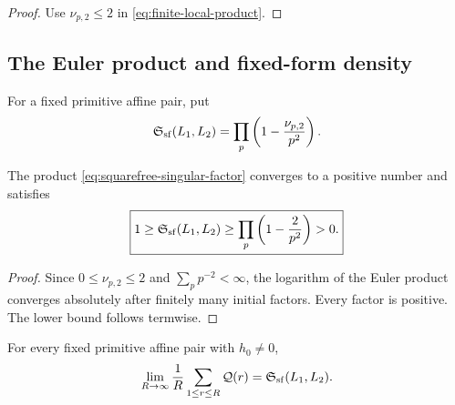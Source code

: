 \begin{proof}
Use \(\nu_{p,2}\le2\) in
\eqref{eq:finite-local-product}.
\end{proof}

\subsection{The Euler product and fixed-form density}

\begin{definition}
\label{def:squarefree-singular-factor}
For a fixed primitive affine pair, put
\begin{equation}
 \mathfrak S_{\mathrm{sf}}(L_1,L_2)
 =
 \prod_p
 \left(1-\frac{\nu_{p,2}}{p^2}\right).
\label{eq:squarefree-singular-factor}
\end{equation}
\end{definition}

\begin{proposition}
\label{prop:euler-product-positive}
The product \eqref{eq:squarefree-singular-factor} converges to a
positive number and satisfies
\begin{equation}
 \boxed{
 1\ge\mathfrak S_{\mathrm{sf}}(L_1,L_2)
 \ge
 \prod_p\left(1-\frac2{p^2}\right)>0.}
\label{eq:universal-squarefree-lower}
\end{equation}
\end{proposition}

\begin{proof}
Since \(0\le\nu_{p,2}\le2\) and
\(\sum_p p^{-2}<\infty\), the logarithm of the Euler product
converges absolutely after finitely many initial factors.  Every
factor is positive.  The lower bound follows termwise.
\end{proof}

\begin{theorem}
\label{thm:fixed-pair-squarefree-density}
For every fixed primitive affine pair with \(h_0\ne0\),
\begin{equation}
 \lim_{R\to\infty}
 \frac1R\sum_{1\le r\le R}\mathcal Q(r)
 =
 \mathfrak S_{\mathrm{sf}}(L_1,L_2).
\label{eq:fixed-pair-density}
\end{equation}
\end{theorem}

